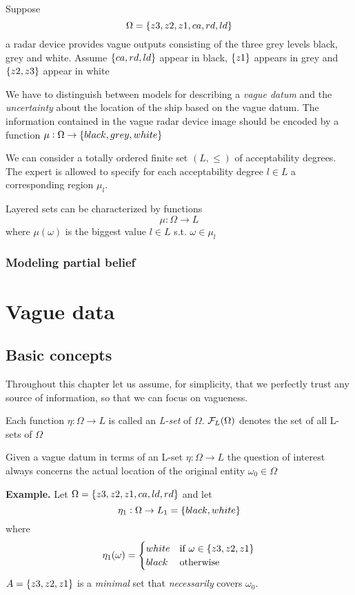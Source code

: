 \documentclass[11pt]{article}
\begin{document}
Suppose
\begin{equation*}
\Omega=\left\{ z3,z2,z1,ca,rd,ld\right\}
\end{equation*}
a radar device provides vague outputs consisting of the three grey levels
black, grey and white. Assume \(\left\{ ca,rd,ld\right\}\) appear in black, \(\left\{ z1\right\}\)
appears in grey and \(\left\{ z2,z3\right\}\) appear in white

We have to distinguish between models for describing a \emph{vague datum} and
the \emph{uncertainty} about the location of the ship based on the vague datum. The
information contained in the vague radar device image should be encoded by a
function \(\mu:\Omega\to\left\{ black,grey,white\right\}\)

We can consider a totally ordered finite set \((L,\le)\) of acceptability
degrees. The expert is allowed to specify for each acceptability degree
\(l\in L\) a corresponding region \(\mu_l\). 

Layered sets can be characterized by functions
\begin{equation*}
\mu:\Omega\to L
\end{equation*}
where \(\mu(\omega)\) is the biggest value \(l\in L\) s.t. \(\omega\in\mu_l\)
\subsubsection{Modeling partial belief}
\label{sec:org07cd68c}
\section{Vague data}
\label{sec:orga592537}
\subsection{Basic concepts}
\label{sec:org356375e}
Throughout this chapter let us assume, for simplicity, that we perfectly
trust any source of information, so that we can focus on vagueness.

\begin{definition}[]
Each function \(\eta:\Omega\to L\) is called an \emph{L-set} of \(\Omega\).
\(\mathcal{F}_L(\Omega)\) denotes the set of all L-sets of \(\Omega\)
\end{definition}
Given a vague datum in terms of an L-set \(\eta:\Omega\to L\) the question of
interest always concerns the actual location of the original entity
\(\omega_0\in\Omega\) 

\textbf{Example.} Let \(\Omega=\left\{ z3,z2,z1,ca,ld,rd\right\}\) and let
\begin{equation*}
\eta_1:\Omega\to L_1=\left\{ black,white\right\}
\end{equation*}
where
\begin{equation*}
\eta_1(\omega)=
\begin{cases}
white&\text{if } \omega\in\left\{ z3,z2,z1\right\}\\
black&\text{otherwise}
\end{cases}
\end{equation*}
\(A=\left\{ z3,z2,z1\right\}\) is a \emph{minimal} set that \emph{necessarily} covers \(\omega_0\).
\end{document}
